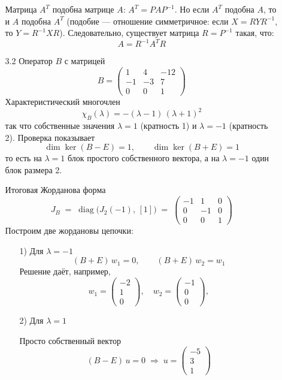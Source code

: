 \documentclass[a4paper]{article}
\begin{document}
\begin{enumerate}
\begin{enumerate}
    Матрица \( A^T \) подобна матрице \( A \): \( A^T = P A P^{-1} \). Но если \( A^T \) подобна \( A \), то и \( A \) подобна \( A^T \) (подобие — отношение симметричное: если \( X = R Y R^{-1} \), то \( Y = R^{-1} X R \)). Следовательно, существует матрица \( R = P^{-1} \) такая, что:
        \[
        A = R^{-1} A^T R
        \]

    \item[3.2]Оператор $B$ с матрицей
    $$
    B=\begin{pmatrix}
    1 & 4  & -12\\
    -1& -3 & 7\\
    0 & 0  & 1
    \end{pmatrix}
    $$
    Характеристический многочлен
    $$
    \chi_B(\lambda)=-(\lambda-1)\,(\lambda+1)^2
    $$
    так что собственные значения $\lambda=1$ (кратность 1) и $\lambda=-1$ (кратность 2).
    Проверка показывает
    $$
    \dim\ker(B-E)=1,\qquad \dim\ker(B+E)=1
    $$
    то есть на $\lambda=1$ блок простого собственного вектора, а на $\lambda=-1$ один блок размера 2.
    
    Итоговая Жорданова форма
    $$
    J_B \;=\;\operatorname{diag}\bigl(J_2(-1),\, [1]\bigr)
    \;=\;
    \begin{pmatrix}
    -1&1&0\\
    0&-1&0\\
    0&0&1
    \end{pmatrix}
    $$
    Построим две жордановы цепочки:
    \begin{enumerate}
    \item[1)] Для $\lambda=-1$
      $$
      (B+E)\,w_1=0,\qquad (B+E)\,w_2=w_1
      $$
      Решение даёт, например,
      $$
      w_1=\begin{pmatrix}-2\\1\\0\end{pmatrix},\quad
      w_2=\begin{pmatrix}-1\\0\\0\end{pmatrix},
      $$

    \item[2)] Для $\lambda=1$
    
      Просто собственный вектор
      $$
      (B-E)\,u=0
      \;\Longrightarrow\;
      u=\begin{pmatrix}-5\\3\\1\end{pmatrix}
      $$
    \end{enumerate}
    

\end{enumerate}
\end{enumerate}
\end{document}
